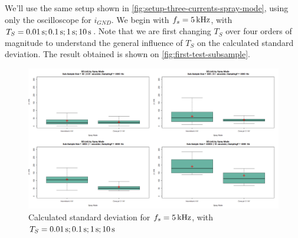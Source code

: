 \documentclass[oneside,12pt]{article}
\begin{document}
We'll use the same setup shown in \autoref{fig:setup-three-currents-spray-mode}, using only the oscilloscope for $i_{GND}$.
We begin with $f_s = 5 \,\mathrm{kHz}$, with $T_S = 0.01 \,\mathrm{s}; 0.1 \,\mathrm{s}; 1 \,\mathrm{s}; 10 \,\mathrm{s}$. Note that we are first changing
$T_S$ over four orders of magnitude to understand the general influence of $T_S$ on the calculated standard deviation.
The result obtained is shown on \autoref{fig:first-test-subsample}.

\begin{figure}[h!]
    \centering
    \includegraphics[width=\textwidth,trim=1 1 1 1,clip]{figures/first-test-subsample.png}
    \caption{Calculated standard deviation for $f_s = 5 \,\mathrm{kHz}$, with $T_S = 0.01 \,\mathrm{s}; 0.1 \,\mathrm{s}; 1 \,\mathrm{s}; 10 \,\mathrm{s}$}
    \label{fig:first-test-subsample}
\end{figure}



\end{document}
